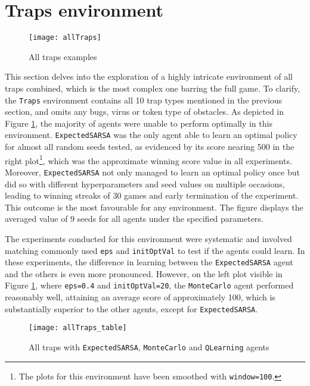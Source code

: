 \section{Traps environment}
\begin{figure}[h]
    \centering
    \texttt{[image: allTraps]}
    \caption{All traps examples}
    \label{fig:alltraps_eg}
\end{figure}

This section delves into the exploration of a highly intricate environment of all traps combined, which is the most complex one barring the full game. To clarify, the \texttt{Traps} environment contains all 10 trap types mentioned in the previous section, and omits any bugs, virus or token type of obstacles. As depicted in Figure \ref{fig:alltraps_eg}, the majority of agents were unable to perform optimally in this environment. \texttt{ExpectedSARSA} was the only agent able to learn an optimal policy for almost all random seeds tested, as evidenced by its score nearing 500 in the right plot\footnote{The plots for this environment have been smoothed with \texttt{window=100}.}, which was the approximate winning score value in all experiments. Moreover, \texttt{ExpectedSARSA} not only managed to learn an optimal policy once but did so with different hyperparameters and seed values on multiple occasions, leading to winning streaks of 30 games and early termination of the experiment. This outcome is the most favourable for any environment. The figure displays the averaged value of 9 seeds for all agents under the specified parameters. 

The experiments conducted for this environment were systematic and involved matching commonly used \texttt{eps} and \texttt{initOptVal} to test if the agents could learn. In these experiments, the difference in learning between the \texttt{ExpectedSARSA} agent and the others is even more pronounced. However, on the left plot visible in Figure \ref{fig:alltraps_eg}, where \texttt{eps=0.4} and \texttt{initOptVal=20}, the \texttt{MonteCarlo} agent performed reasonably well, attaining an average score of approximately 100, which is substantially superior to the other agents, except for \texttt{ExpectedSARSA}.

\begin{figure}[h]
    \centering
    \texttt{[image: allTraps\_table]}
    \caption{All traps with \texttt{ExpectedSARSA}, \texttt{MonteCarlo} and \texttt{QLearning} agents}
    \label{fig:traps_table_eg}
\end{figure}

